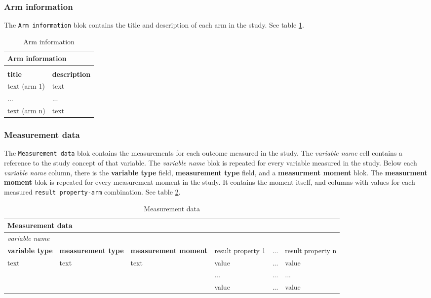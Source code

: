 \documentclass[a4paper,10pt]{article}
\begin{document}
\subsubsection*{Arm information}
The \texttt{Arm information} blok contains the title and description of each arm in the study. See table \ref{table:Arm information}.
\begin{table}[h]
  \centering
  \caption{Arm information}
  \label{table:Arm information}
  \begin{tabular}{|l|l|}
    \hline
    \multicolumn{2}{|l|}{\textbf{Arm information}}  \\ \hline
    \multicolumn{2}{|l|}{}                          \\ \hline
    \textbf{title} & \textbf{description}           \\ \hline
    text (arm 1)& text                              \\ \hline
    ... & ...                                       \\ \hline
    text (arm n)& text                              \\ \hline
  \end{tabular}
\end{table}

\subsubsection*{Measurement data}
The \texttt{Measurement data} blok contains the measurements for each outcome measured in the study. The \textit{variable name} cell contains a reference to the study concept of that variable. The \textit{variable name} blok is repeated for every variable measured in the study. Below each \textit{variable name} column, there is the \textbf{variable type} field, \textbf{measurement type} field, and a \textbf{measurment moment} blok. The \textbf{measurment moment} blok is repeated for every measurement moment in the study. It contains the moment itself, and columns with values for each measured \texttt{result property-arm} combination.
See table \ref{table:Measurement data}.
\begin{table}[h]
  \centering
  \caption{Measurement data}
  \small
  \label{table:Measurement data}
  \begin{tabular}{|l|l|l|l|l|l|}
    \hline
    \multicolumn{6}{|l}{\textbf{Measurement data}}  \\ \hline
    \multicolumn{6}{|l|}{\textit{variable name}}    \\ \hline
    \textbf{variable type} &\textbf{ measurement type} & \textbf{measurement moment} & result property 1 &  ... & result property n \\ \hline
    text & text & text & value & ... & value        \\  \cline{4-6} 
         &      &      & ...   & ... & ...          \\  \cline{4-6} 
         &      &      & value & ... & value        \\ \hline
  \end{tabular}
\end{table}
\end{document}
